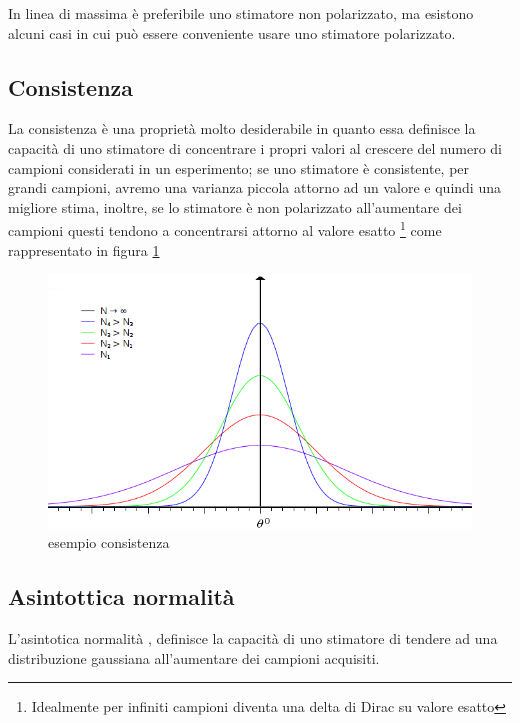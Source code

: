 In linea di massima è preferibile uno stimatore non polarizzato, ma esistono alcuni casi in cui può essere conveniente usare uno stimatore polarizzato. 


\subsection{Consistenza}
La consistenza  è una proprietà molto desiderabile in quanto essa definisce la capacità di uno stimatore di concentrare i propri valori al crescere del numero di campioni considerati in un esperimento; se uno stimatore è consistente, per grandi campioni, avremo una varianza piccola attorno ad un valore e quindi una migliore stima, inoltre, se lo stimatore è non polarizzato all'aumentare dei campioni questi tendono a concentrarsi attorno al valore esatto \footnote{Idealmente per infiniti campioni diventa una delta di Dirac su valore esatto} come rappresentato in figura \ref{fig:esconsistenza}

\begin{figure}[htbp]
  \centering
  \includegraphics[scale=0.5]{img/G2D.png}
  \caption{esempio consistenza\label{fig:esconsistenza}}
\end{figure}

\subsection{Asintottica normalità}
L'asintotica normalità , definisce la capacità di uno stimatore di tendere ad una distribuzione gaussiana all'aumentare dei campioni acquisiti.
